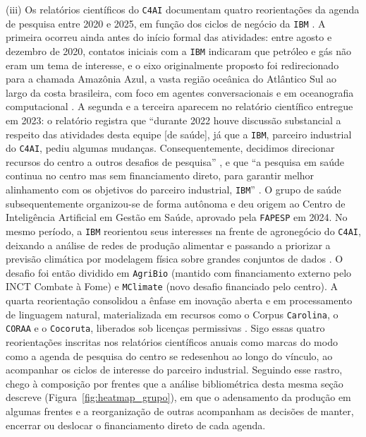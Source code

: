(iii) Os relatórios científicos do \texttt{C4AI} documentam quatro reorientações da agenda de pesquisa entre 2020 e 2025, em função dos ciclos de negócio da \texttt{IBM} \parencite{C4AI2021, C4AI2023, C4AI2024}. A primeira ocorreu ainda antes do início formal das atividades: entre agosto e dezembro de 2020, contatos iniciais com a \texttt{IBM} indicaram que petróleo e gás não eram um tema de interesse, e o eixo originalmente proposto foi redirecionado para a chamada Amazônia Azul, a vasta região oceânica do Atlântico Sul ao largo da costa brasileira, com foco em agentes conversacionais e em oceanografia computacional \parencite{C4AI2021, C4AI2022}. A segunda e a terceira aparecem no relatório científico entregue em 2023: o relatório registra que \enquote{durante 2022 houve discussão substancial a respeito das atividades desta equipe [de saúde], já que a \texttt{IBM}, parceiro industrial do \texttt{C4AI}, pediu algumas mudanças. Consequentemente, decidimos direcionar recursos do centro a outros desafios de pesquisa} \parencite[p.~10]{C4AI2023}, e que \enquote{a pesquisa em saúde continua no centro mas sem financiamento direto, para garantir melhor alinhamento com os objetivos do parceiro industrial, \texttt{IBM}} \parencite[p.~12]{C4AI2023}. O grupo de saúde subsequentemente organizou-se de forma autônoma e deu origem ao Centro de Inteligência Artificial em Gestão em Saúde, aprovado pela \texttt{FAPESP} em 2024. No mesmo período, a \texttt{IBM} reorientou seus interesses na frente de agronegócio do \texttt{C4AI}, deixando a análise de redes de produção alimentar e passando a priorizar a previsão climática por modelagem física sobre grandes conjuntos de dados \parencite{C4AI2023}. O desafio foi então dividido em \texttt{AgriBio} (mantido com financiamento externo pelo INCT Combate à Fome) e \texttt{MClimate} (novo desafio financiado pelo centro). A quarta reorientação consolidou a ênfase em inovação aberta e em processamento de linguagem natural, materializada em recursos como o Corpus \texttt{Carolina}, o \texttt{CORAA} e o \texttt{Cocoruta}, liberados sob licenças permissivas \parencite{C4AI2022, C4AI2025}. Sigo essas quatro reorientações inscritas nos relatórios científicos anuais como marcas do modo como a agenda de pesquisa do centro se redesenhou ao longo do vínculo, ao acompanhar os ciclos de interesse do parceiro industrial. Seguindo esse rastro, chego à composição por frentes que a análise bibliométrica desta mesma seção descreve (Figura~\ref{fig:heatmap_grupo}), em que o adensamento da produção em algumas frentes e a reorganização de outras acompanham as decisões de manter, encerrar ou deslocar o financiamento direto de cada agenda.

